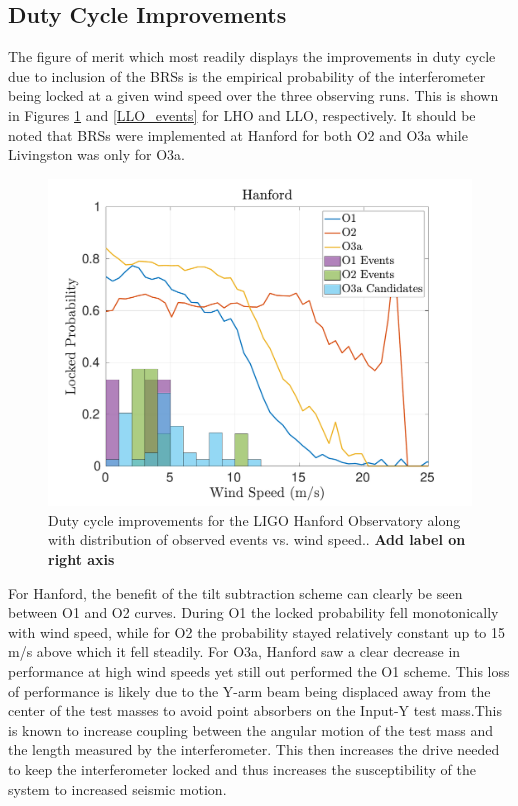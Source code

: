 \documentclass [12pt, proquest]{uwthesis}[2019]
\begin{document}
\subsection{Duty Cycle Improvements}

The figure of merit which most readily displays the improvements in duty cycle due to inclusion of the BRSs is the empirical probability of the interferometer being locked at a given wind speed over the three observing runs. This is shown in Figures \ref{LHO_events} and \ref{LLO_events} for LHO and LLO, respectively. It should be noted that BRSs were implemented at Hanford for both O2 and O3a while Livingston was only for O3a.

\begin{figure}[!h]
\begin{center}
\includegraphics[width=\textwidth]{LHO_WindVsLockEvents.pdf}
\caption[Duty cycle improvements for the LIGO Hanford Observatory]{Duty cycle improvements for the LIGO Hanford Observatory along with distribution of observed events vs. wind speed.. \textbf{Add label on right axis}}
\label{LHO_events}
\end{center}
\end{figure}

For Hanford, the benefit of the tilt subtraction scheme can clearly be seen between O1 and O2 curves. During O1 the locked probability fell monotonically with wind speed, while for O2 the probability stayed relatively constant up to 15 m/s above which it fell steadily. For O3a, Hanford saw a clear decrease in performance at high wind speeds yet still out performed the O1 scheme. This loss of performance is likely due to the Y-arm beam being displaced away from the center of the test masses to avoid point absorbers on the Input-Y test mass.This is known to increase coupling between the angular motion of the test mass and the length measured by the interferometer. This then increases the drive needed to keep the interferometer locked and thus increases the susceptibility of the system to increased seismic motion. 
\end{document}
